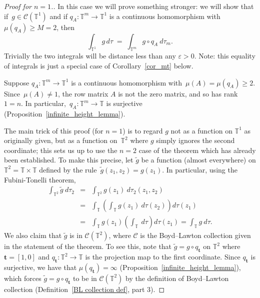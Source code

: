 \documentclass[12pt]{amsart}
\theoremstyle{plain}
\theoremstyle{definition}
\theoremstyle{remark}
\numberwithin{theorem}{section}
\numberwithin{equation}{section} %
\newcommand{\mc}{\mathcal}
\newcommand{\mb}{\mathbf}
\newcommand{\torus}{{\mathbb{T}}}
\begin{document}
\begin{proof}[Proof for $n=1$.]
In this case we will prove something stronger: we will show that if~$g\in \mc C(\torus^1)$ and if 
$q_A \colon \torus^m \to \torus^1$ is a continuous homomorphism with $\mu\left(q_A\right) \ge M = 2$,
then
$$
 \int_{\torus^{1}} g \, d \tau
 \;  = \; 
\int_{\torus^{m}} g \circ q_{A} \ d \tau_{m}.
$$
Trivially the two integrals will be distance less than any $\varepsilon>0$.  Note: this equality of integrals is just a special case of Corollary~\ref{cor_mt} below.

Suppose $q_A \colon \torus^m \to \torus^1$ is a continuous homomorphism with~$\mu(A) = \mu\left(q_A\right) \ge 2$. Since~$\mu(A) \ne 1$, the row matrix $A$ is not the zero matrix, and so has rank $1=n$.
In particular,~$q_A \colon \torus^m \to \torus$ is surjective (Proposition~\ref{infinite_height_lemma}).

The main trick of this proof (for $n=1$) is to regard $g$ not as a function on $\torus^1$ as originally given, but as a function on~$\torus^2$ where $g$  simply ignores the second coordinate;
this sets us up to use the $n = 2$ case of the theorem which has already been established.
To make this precise, let $\tilde g$ be a function (almost everywhere) on $\torus^2= \torus \times \torus$
defined by the rule~$\tilde g(z_1, z_2) = g(z_1)$. 
In particular, using the Fubini-Tonelli theorem,
\begin{eqnarray*}
\int_{\torus^2} \tilde g \ d\tau_2 
&=& \int_{\torus^2} g (z_1) \ d\tau_2(z_1, z_2) \\
&=& \int_{\torus} \left( \int_{\torus} g(z_1) \ d\tau(z_2) \right) d\tau  (z_1) \\
&=& \int_{\torus}  g(z_1) \left( \int_{\torus}  \ d\tau \right) d\tau  (z_1)   = \int_{\torus} g \ d\tau.
\end{eqnarray*}
We also claim that $\tilde g$ is in $\mc C(\torus^2)$, where $\mc C$ is the  Boyd--Lawton collection given in the statement of the theorem.
To see this, note that  $\tilde g = g\circ q_{\mb t}$ on $\torus^2$ where $\mb t = [1, 0]$ and $q_{\mb t} \colon \torus^2 \to \torus$ is the projection map to the first coordinate. Since $q_{\mb t}$ is surjective, we have 
that $\mu \left(q_{\mb t}\right) = \infty$ (Proposition~\ref{infinite_height_lemma}), which forces $\tilde g= g\circ q_{\mb t}$ to be in $\mc C(\torus^2)$ by the definition of Boyd--Lawton collection (Definition~\ref{BL collection def}, part 3).



\end{proof}
\end{document}
